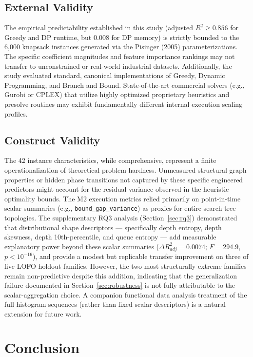 \documentclass[11pt,a4paper]{article}
\begin{document}
\subsection{External Validity}
The empirical predictability established in this study (adjusted $R^2 \ge 0.856$ for Greedy and DP runtime, but $0.008$ for DP memory) is strictly bounded to the 6,000 knapsack instances generated via the Pisinger (2005) parameterizations. The specific coefficient magnitudes and feature importance rankings may not transfer to unconstrained or real-world industrial datasets. Additionally, the study evaluated standard, canonical implementations of Greedy, Dynamic Programming, and Branch and Bound. State-of-the-art commercial solvers (e.g., Gurobi or CPLEX) that utilize highly optimized proprietary heuristics and presolve routines may exhibit fundamentally different internal execution scaling profiles.

\subsection{Construct Validity}
The 42 instance characteristics, while comprehensive, represent a finite operationalization of theoretical problem hardness. Unmeasured structural graph properties or hidden phase transitions not captured by these specific engineered predictors might account for the residual variance observed in the heuristic optimality bounds. The M2 execution metrics relied primarily on point-in-time scalar summaries (e.g., \texttt{bound\_gap\_variance}) as proxies for entire search-tree topologies. The supplementary RQ3 analysis (Section~\ref{sec:rq3}) demonstrated that distributional shape descriptors --- specifically depth entropy, depth skewness, depth 10th-percentile, and queue entropy --- add measurable explanatory power beyond these scalar summaries ($\Delta R^2_{adj} = 0.0074$; $F = 294.9$, $p < 10^{-16}$), and provide a modest but replicable transfer improvement on three of five LOFO holdout families. However, the two most structurally extreme families remain non-predictive despite this addition, indicating that the generalization failure documented in Section~\ref{sec:robustness} is not fully attributable to the scalar-aggregation choice. A companion functional data analysis treatment of the full histogram sequences (rather than fixed scalar descriptors) is a natural extension for future work.

\section{Conclusion}
\end{document}
